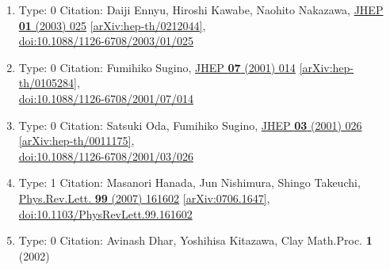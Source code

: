 \documentclass[a4paper,10pt]{article}
\begin{document}
\begin{enumerate}
\begin{enumerate}
  \item Type: 0 Citation: Daiji Ennyu, Hiroshi Kawabe, Naohito Nakazawa, \href{https://www.doi.org/10.1088/1126-6708/2003/01/025}{JHEP {\bf 01} (2003) 025}  \href{https://arxiv.org/abs/hep-th/0212044}{[arXiv:hep-th/0212044]},\\\href{https://www.doi.org/10.1088/1126-6708/2003/01/025}{doi:10.1088/1126-6708/2003/01/025}
  \item Type: 0 Citation: Fumihiko Sugino, \href{https://www.doi.org/10.1088/1126-6708/2001/07/014}{JHEP {\bf 07} (2001) 014}  \href{https://arxiv.org/abs/hep-th/0105284}{[arXiv:hep-th/0105284]},\\\href{https://www.doi.org/10.1088/1126-6708/2001/07/014}{doi:10.1088/1126-6708/2001/07/014}
  \item Type: 0 Citation: Satsuki Oda, Fumihiko Sugino, \href{https://www.doi.org/10.1088/1126-6708/2001/03/026}{JHEP {\bf 03} (2001) 026}  \href{https://arxiv.org/abs/hep-th/0011175}{[arXiv:hep-th/0011175]},\\\href{https://www.doi.org/10.1088/1126-6708/2001/03/026}{doi:10.1088/1126-6708/2001/03/026}
  \item Type: 1 Citation: Masanori Hanada, Jun Nishimura, Shingo Takeuchi, \href{https://www.doi.org/10.1103/PhysRevLett.99.161602}{Phys.Rev.Lett. {\bf 99} (2007) 161602}  \href{https://arxiv.org/abs/0706.1647}{[arXiv:0706.1647]},\\\href{https://www.doi.org/10.1103/PhysRevLett.99.161602}{doi:10.1103/PhysRevLett.99.161602}
  \item Type: 0 Citation: Avinash Dhar, Yoshihisa Kitazawa, Clay Math.Proc. {\bf 1} (2002) 

\end{enumerate}
\end{enumerate}
\end{document}
